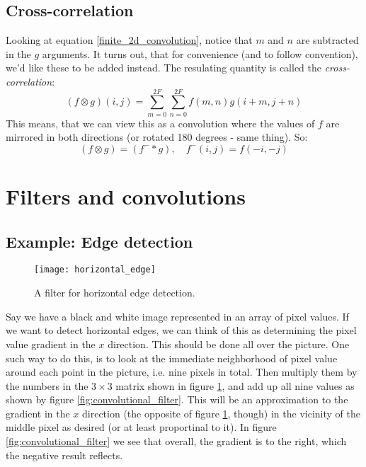 \documentclass[12pt, a4paper]{article}
\numberwithin{equation}{section}
\begin{document}
\subsection{Cross-correlation}
Looking at equation \ref{finite_2d_convolution}, notice that $m$ and $n$ are subtracted in the $g$ arguments. It turns out, that for convenience (and to follow convention), we'd like these to be added instead. The resulating quantity is called the \textit{cross-correlation}:
\begin{equation}
(f\otimes g)(i,j)=\sum_{m=0}^{2F}\sum_{n=0}^{2F}f(m,n)g(i+m,j+n)
\label{cross_correlation}
\end{equation}
This means, that we can view this as a convolution where the values of $f$ are mirrored in both directions (or rotated 180 degrees - same thing). So:
\begin{equation}
(f\otimes g)=(f^-*g),\quad f^-(i,j)=f(-i,-j)
\end{equation}

\section{Filters and convolutions}

\subsection{Example: Edge detection}

\begin{figure}
\centering
\texttt{[image: horizontal\_edge]}
\caption{A filter for horizontal edge detection.}
\label{fig:horizontal_edge}
\end{figure}

Say we have a black and white image represented in an array of pixel values. If we want to detect horizontal edges, we can think of this as determining the pixel value gradient in the $x$ direction. This should be done all over the picture. One such way to do this, is to look at the immediate neighborhood of pixel value around each point in the picture, i.e. nine pixels in total. Then multiply them by the numbers in the $3\times 3$ matrix shown in figure \ref{fig:horizontal_edge}, and add up all nine values as shown by figure \ref{fig:convolutional_filter}. This will be an approximation to the gradient in the $x$ direction (the opposite of figure \ref{fig:horizontal_edge}, though) in the vicinity of the middle pixel as desired (or at least proportinal to it). In figure \ref{fig:convolutional_filter} we see that overall, the gradient is to the right, which the negative result reflects.
\end{document}
